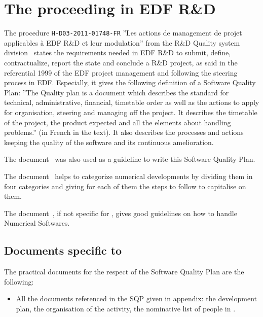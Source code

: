 \chapter{The proceeding in EDF R\&D}

The procedure \verb!H-D03-2011-01748-FR! ''Les actions de management de projet
applicables à EDF R\&D et leur modulation'' from the R\&D Quality system
division~\cite{projmanag} states the requirements needed in EDF
R\&D to submit, define, contractualize, report the state and conclude a R\&D
project, as said in the referential 1999 of the EDF project management and
following the steering process in EDF\@. Especially, it gives the following
definition of a Software Quality Plan: ''The Quality plan is a document which
describes the standard for technical, administrative, financial, timetable
order as well as the actions to apply for organisation, steering and managing
off the project. It describes the timetable of the project, the product
expected and all the elements about handling problems.'' (in French in the
text). It also describes the processes and actions keeping the quality of the
software and its continuous amelioration.

The document~\cite{guidepql} was also used as a guideline to write this Software
Quality Plan.

The document~\cite{capelemnum} helps to categorize numerical developments by
dividing them in four categories and giving for each of them the steps to follow
to capitalise on them.

The document~\cite{Ocs}, if not specific for \telemacsystem{}, gives good
guidelines on how to handle Numerical Softwares.

\section{Documents specific to \telemacsystem}

The practical documents for the respect of the Software Quality Plan are the
following:
\begin{itemize}
\item All the documents referenced in the SQP given in appendix: the
  development plan, the organisation of the \telemacsystem{} activity, the
  nominative list of people in \telemacsystem.
\end{itemize}

